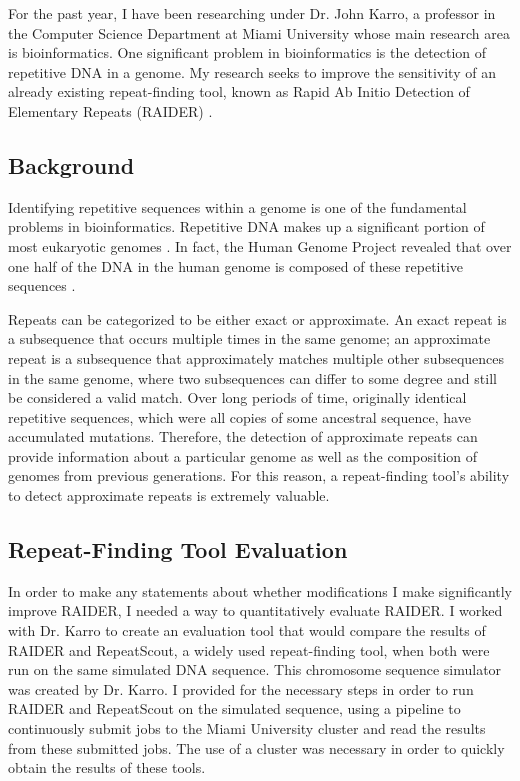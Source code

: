 \documentclass[12pt, doublespace]{article}
\begin{document}
\newcommand\COURSE{Charlotte Schaeffer}
\newcommand\HWNUM{Research Overview}             
For the past year, I have been researching under Dr. John Karro, a professor in the Computer Science Department at Miami University whose main research area is bioinformatics. One significant problem in bioinformatics is the detection of repetitive DNA in a genome. My research seeks to improve the sensitivity of an already existing repeat-finding tool, known as Rapid Ab Initio Detection of Elementary Repeats (RAIDER) \cite{figueroa2013raiderpaper}.

\subsection{Background}

Identifying repetitive sequences within a genome is one of the fundamental problems in bioinformatics. Repetitive DNA makes up a significant portion of most eukaryotic genomes \cite{pevzner2004de-novo}. In fact, the Human Genome Project revealed that over one half of the DNA in the human genome is composed of these repetitive sequences \cite{lander2001initial}.

Repeats can be categorized to be either exact or approximate. An exact repeat is a subsequence that occurs multiple times in the same genome; an approximate repeat is a subsequence that approximately matches multiple other subsequences in the same genome, where two subsequences can differ to some degree and still be considered a valid match. Over long periods of time, originally identical repetitive sequences, which were all copies of some ancestral sequence, have accumulated mutations. Therefore, the detection of approximate repeats can provide information about a particular genome as well as the composition of genomes from previous generations. For this reason, a repeat-finding tool's ability to detect approximate repeats is extremely valuable. 

\subsection{Repeat-Finding Tool Evaluation}
In order to make any statements about whether modifications I make significantly improve RAIDER, I needed a way to quantitatively evaluate RAIDER. I worked with Dr. Karro to create an evaluation tool that would compare the results of RAIDER and RepeatScout, a widely used repeat-finding tool, when both were run on the same simulated DNA sequence. This chromosome sequence simulator was created by Dr. Karro. I provided for the necessary steps in order to run RAIDER and RepeatScout on the simulated sequence, using a pipeline to continuously submit jobs to the Miami University cluster and read the results from these submitted jobs. The use of a cluster was necessary in order to quickly obtain the results of these tools.
\end{document}
